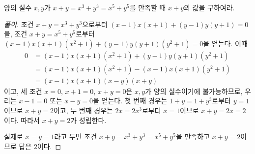 \documentclass{../../large}
\begin{document}
\begin{example}
양의 실수 $x,y$가 $x+y=x^3+y^3=x^5+y^5$를 만족할 때 $x+y$의 값을 구하여라.
\end{example}
\begin{linenumbers*}
\begin{proof}[풀이]
조건 $x+y=x^3+y^3$으로부터 $(x-1)x(x+1)+(y-1)y(y+1)=0$을, 조건 $x+y=x^5+y^5$로부터 $(x-1)x(x+1)(x^2+1)+(y-1)y(y+1)(y^2+1)=0$을 얻는다.
이때
\begin{align*}
0&=(x-1)x(x+1)(x^2+1)+(y-1)y(y+1)(y^2+1)\\
&=(x-1)x(x+1)(x^2+1)-(x-1)x(x+1)(y^2+1)\\
&=(x-1)x(x+1)(x-y)(x+y)
\end{align*}
이고, 세 조건 $x=0$, $x+1=0$, $x+y=0$은 $x,y$가 양의 실수이기에 불가능하므로, 우리는 $x-1=0$ 또는 $x-y=0$을 얻는다.
첫 번째 경우는 $1+y=1+y^3$로부터 $y=1$이므로 $x+y=2$이고, 두 번째 경우는 $2x=2x^3$로부터 $x=1$이므로 $x+y=2x=2$이다.
따라서 $x+y=2$가 성립한다.

실제로 $x=y=1$라고 두면 조건 $x+y=x^3+y^3=x^5+y^5$을 만족하고 $x+y=2$이므로 답은 $2$이다.
\end{proof}
\end{linenumbers*}
\end{document}
